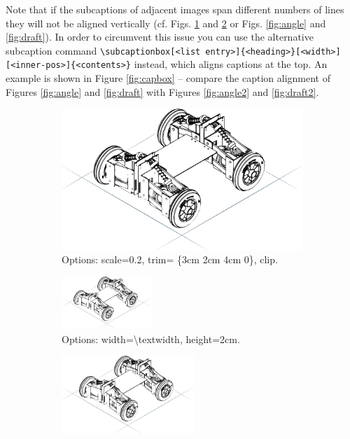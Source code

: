Note that if the subcaptions of adjacent images span different numbers of lines they will not be aligned vertically (cf. Figs. \ref{fig:trim} and \ref{fig:smush} or Figs. \ref{fig:angle} and \ref{fig:draft}). In order to circumvent this issue you can use the alternative subcaption command \texttt{\textbackslash subcaptionbox[<list entry>]\{<heading>\}[<width>][<inner-pos>]\{<contents>\}} instead, which aligns captions at the top. An example is shown in Figure \ref{fig:capbox} -- compare the caption alignment of Figures \ref{fig:angle} and \ref{fig:draft} with Figures \ref{fig:angle2} and \ref{fig:draft2}.

\begin{figure}
\centering
\begin{subfigure}[b]{.3\linewidth}
	\centering
	\includegraphics[scale=0.2,trim={3cm 2cm 4cm 0},clip]{figures/trak_skeleton}
	\caption{Options: scale=0.2, trim= \{3cm 2cm 4cm 0\}, clip.}
	\label{fig:trim}
\end{subfigure}\hfill
\begin{subfigure}[b]{.65\linewidth}
	\centering
	\includegraphics[width=\textwidth, height=2cm]{figures/trak_skeleton}
	\caption{Options: width=\textbackslash textwidth, height=2cm.}
	\label{fig:smush}
\end{subfigure}
\begin{subfigure}[b]{.45\linewidth}
	\centering
	\includegraphics[width=5cm, angle=45]{figures/trak_skeleton}

\end{subfigure}
\end{figure}
